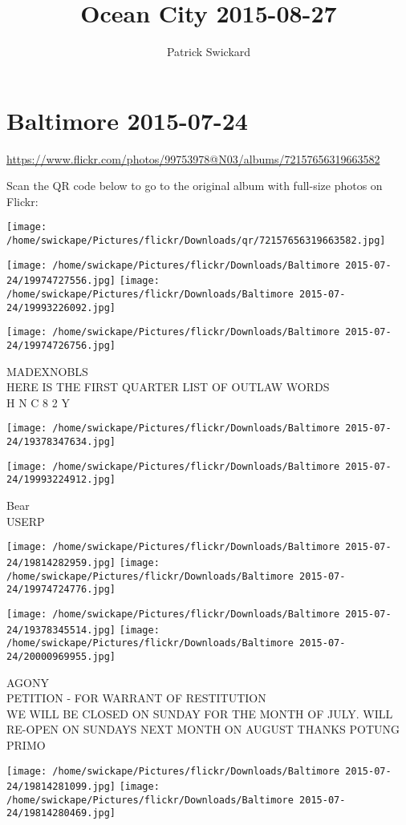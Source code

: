 \documentclass[10pt,letterpaper]{article}
\title{Ocean City 2015-08-27}
\author{Patrick Swickard}
\date{}
\begin{document}
\section*{Baltimore 2015-07-24}

\url{https://www.flickr.com/photos/99753978@N03/albums/72157656319663582}

Scan the QR code below to go to the original album with full-size photos on Flickr:

\texttt{[image: /home/swickape/Pictures/flickr/Downloads/qr/72157656319663582.jpg]}
\pagebreak

\texttt{[image: /home/swickape/Pictures/flickr/Downloads/Baltimore 2015-07-24/19974727556.jpg]}
\texttt{[image: /home/swickape/Pictures/flickr/Downloads/Baltimore 2015-07-24/19993226092.jpg]}

\texttt{[image: /home/swickape/Pictures/flickr/Downloads/Baltimore 2015-07-24/19974726756.jpg]}

MADEXNOBLS\\
HERE IS THE FIRST QUARTER LIST OF OUTLAW WORDS\\
H N C 8 2 Y
\pagebreak

\texttt{[image: /home/swickape/Pictures/flickr/Downloads/Baltimore 2015-07-24/19378347634.jpg]}

\vspace{0.25in}
\texttt{[image: /home/swickape/Pictures/flickr/Downloads/Baltimore 2015-07-24/19993224912.jpg]}

Bear\\
USERP
\pagebreak

\texttt{[image: /home/swickape/Pictures/flickr/Downloads/Baltimore 2015-07-24/19814282959.jpg]}
\texttt{[image: /home/swickape/Pictures/flickr/Downloads/Baltimore 2015-07-24/19974724776.jpg]}

\texttt{[image: /home/swickape/Pictures/flickr/Downloads/Baltimore 2015-07-24/19378345514.jpg]}
\texttt{[image: /home/swickape/Pictures/flickr/Downloads/Baltimore 2015-07-24/20000969955.jpg]}

AGONY\\
PETITION {-} FOR WARRANT OF RESTITUTION\\
WE WILL BE CLOSED ON SUNDAY FOR THE MONTH OF JULY.  WILL RE{-}OPEN ON SUNDAYS NEXT MONTH ON AUGUST THANKS POTUNG\\
PRIMO
\pagebreak

\texttt{[image: /home/swickape/Pictures/flickr/Downloads/Baltimore 2015-07-24/19814281099.jpg]}
\texttt{[image: /home/swickape/Pictures/flickr/Downloads/Baltimore 2015-07-24/19814280469.jpg]}
\end{document}
